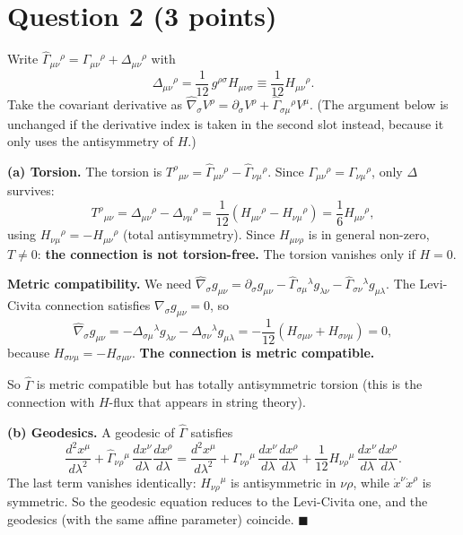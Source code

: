 \documentclass[12pt]{article}
\begin{document}
\section*{Question 2 (3 points)}

Write $\hat\Gamma_{\mu\nu}{}^\rho=\Gamma_{\mu\nu}{}^\rho+\Delta_{\mu\nu}{}^\rho$ with
\[
\Delta_{\mu\nu}{}^\rho=\frac{1}{12}\,g^{\rho\sigma}H_{\mu\nu\sigma}\equiv\frac{1}{12}H_{\mu\nu}{}^\rho .
\]
Take the covariant derivative as $\hat\nabla_\sigma V^\rho=\partial_\sigma V^\rho+\hat\Gamma_{\sigma\mu}{}^\rho V^\mu$. (The argument below is unchanged if the derivative index is taken in the second slot instead, because it only uses the antisymmetry of $H$.)

\textbf{(a) Torsion.} The torsion is $T^\rho{}_{\mu\nu}=\hat\Gamma_{\mu\nu}{}^\rho-\hat\Gamma_{\nu\mu}{}^\rho$. Since $\Gamma_{\mu\nu}{}^\rho=\Gamma_{\nu\mu}{}^\rho$, only $\Delta$ survives:
\[
T^\rho{}_{\mu\nu}=\Delta_{\mu\nu}{}^\rho-\Delta_{\nu\mu}{}^\rho=\frac{1}{12}\left(H_{\mu\nu}{}^\rho-H_{\nu\mu}{}^\rho\right)=\frac{1}{6}H_{\mu\nu}{}^\rho ,
\]
using $H_{\nu\mu}{}^\rho=-H_{\mu\nu}{}^\rho$ (total antisymmetry). Since $H_{\mu\nu\rho}$ is in general non-zero, $T\neq 0$: \textbf{the connection is not torsion-free.} The torsion vanishes only if $H=0$.

\textbf{Metric compatibility.} We need $\hat\nabla_\sigma g_{\mu\nu}=\partial_\sigma g_{\mu\nu}-\hat\Gamma_{\sigma\mu}{}^\lambda g_{\lambda\nu}-\hat\Gamma_{\sigma\nu}{}^\lambda g_{\mu\lambda}$. The Levi-Civita connection satisfies $\nabla_\sigma g_{\mu\nu}=0$, so
\[
\hat\nabla_\sigma g_{\mu\nu}=-\Delta_{\sigma\mu}{}^\lambda g_{\lambda\nu}-\Delta_{\sigma\nu}{}^\lambda g_{\mu\lambda}
=-\frac{1}{12}\left(H_{\sigma\mu\nu}+H_{\sigma\nu\mu}\right)=0,
\]
because $H_{\sigma\nu\mu}=-H_{\sigma\mu\nu}$. \textbf{The connection is metric compatible.}

So $\hat\Gamma$ is metric compatible but has totally antisymmetric torsion (this is the connection with $H$-flux that appears in string theory).

\textbf{(b) Geodesics.} A geodesic of $\hat\Gamma$ satisfies
\[
\frac{d^2x^\mu}{d\lambda^2}+\hat\Gamma_{\nu\rho}{}^\mu\,\frac{dx^\nu}{d\lambda}\frac{dx^\rho}{d\lambda}=\frac{d^2x^\mu}{d\lambda^2}+\Gamma_{\nu\rho}{}^\mu\,\frac{dx^\nu}{d\lambda}\frac{dx^\rho}{d\lambda}+\frac{1}{12}H_{\nu\rho}{}^\mu\,\frac{dx^\nu}{d\lambda}\frac{dx^\rho}{d\lambda}.
\]
The last term vanishes identically: $H_{\nu\rho}{}^\mu$ is antisymmetric in $\nu\rho$, while $\dot x^\nu\dot x^\rho$ is symmetric. So the geodesic equation reduces to the Levi-Civita one, and the geodesics (with the same affine parameter) coincide. $\blacksquare$
\end{document}
